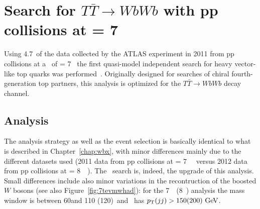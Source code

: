 \clearpage{\pagestyle{empty}\cleardoublepage}

\chapter{Search for $T\bar{T}\to WbWb$ with pp collisions at \rts = 7~\tev}\label{app:wbx7tev}

Using 4.7\ifb\ of the data collected by the ATLAS experiment
in 2011 from pp collisions at a \cme\ of \rts = 7~\tev
the first quasi-model independent search for heavy vector-like
top quarks was performed~\cite{ATLAS:2012qe}. Originally designed for searches
of chiral fourth-generation top partners, this 
analysis is optimized for the $T\bar{T}\to WbWb$ 
decay channel.

\section{Analysis}

The analysis strategy as well as the event selection is
basically identical to what is described in Chapter~\ref{chap:wbx},
with minor differences mainly due to the different datasets
used (2011 data from pp collisions at \rts = 7~\tev~\cite{topCommonObjects2012}
versus 2012 data from pp collisions at \rts = 8~\tev~\cite{topCommonObjects2013}).
The \wbx\ search is, indeed, the upgrade of this analysis.
Small differences include also minor variations in the recontruction
of the boosted $W$ bosons (see also Figure~\ref{fig:7tevmwhad}): for the 7~\tev\ (8~\tev) analysis
the mass window is between 60\gev and 110 (120)\gev\ and \wii\ 
has $\pt(jj)>150 (200)\gev$. 


